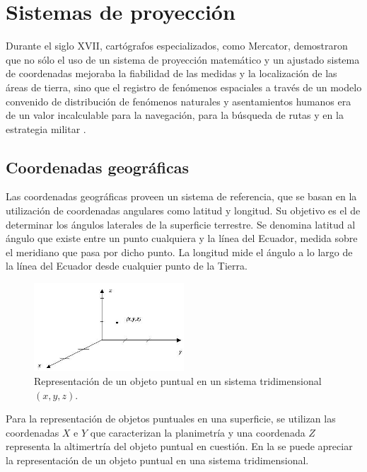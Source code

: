 \section{Sistemas de proyección}
\label{sec:cap2-sistemas-de-proyeccion}
Durante el siglo XVII, cartógrafos especializados, como Mercator, demostraron que no sólo el uso de
un sistema de proyección matemático y un ajustado sistema de coordenadas mejoraba la fiabilidad de
las medidas y la localización de las áreas de tierra, sino que el registro de fenómenos espaciales
a través de un modelo convenido de distribución de fenómenos naturales y asentamientos humanos era
de un valor incalculable para la navegación, para la búsqueda de rutas y en la estrategia militar
\citep{llopis2006sistemas}.

\subsection{Coordenadas geográficas}
Las coordenadas geográficas proveen un sistema de referencia, que se basan en la utilización de
coordenadas angulares como latitud y longitud. Su objetivo es el de determinar los ángulos
laterales de la superficie terrestre. Se denomina latitud al ángulo que existe entre un punto
cualquiera y la línea del Ecuador, medida sobre el meridiano que pasa por dicho punto. La longitud
mide el ángulo a lo largo de la línea del Ecuador desde cualquier punto de la Tierra.

\begin{figure}
\centering
\includegraphics[width=0.5\textwidth]{capitulo-2/graphics/coordenadas-xyz.jpg}
\caption{\label{fig:sig-xyz} Representación de un objeto puntual en un sistema tridimensional
 $(x,y,z)$.}
\end{figure}

Para la representación de objetos puntuales en una superficie, se utilizan las coordenadas $X$ e
$Y$ que caracterizan la planimetría y una coordenada $Z$ representa la altimertría del objeto
puntual en cuestión. En la  se puede apreciar la representación de un objeto
puntual en una sistema tridimensional.

